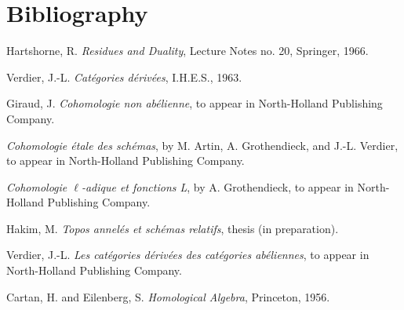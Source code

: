 \section*{Bibliography}
\begin{description}[leftmargin=2.5cm,style=nextline]
\item[{[H]}] Hartshorne, R. \emph{Residues and Duality}, Lecture Notes no. 20, Springer, 1966.
\item[{[V]}] Verdier, J.-L. \emph{Catégories dérivées}, I.H.E.S., 1963.
\item[{[G]}] Giraud, J. \emph{Cohomologie non abélienne}, to appear in North-Holland Publishing Company.
\item[{SGA 4}] \emph{Cohomologie étale des schémas}, by M. Artin, A. Grothendieck, and J.-L. Verdier, to appear in North-Holland Publishing Company.
\item[{SGA 5}] \emph{Cohomologie \(\ell\)-adique et fonctions L}, by A. Grothendieck, to appear in North-Holland Publishing Company.
\item[{[1]}] Hakim, M. \emph{Topos annelés et schémas relatifs}, thesis (in preparation).
\item[{[2]}] Verdier, J.-L. \emph{Les catégories dérivées des catégories abéliennes}, to appear in North-Holland Publishing Company.
\item[{[MUL]}] Cartan, H. and Eilenberg, S. \emph{Homological Algebra}, Princeton, 1956.
\end{description}



\providecommand{\cS}{\mathcal S}
\providecommand{\cCz}{\mathcal C_0}
\providecommand{\cCone}{\mathcal C_1}
\providecommand{\cA}{\mathcal A}
\providecommand{\cB}{\mathcal B}
\providecommand{\cL}{\mathcal L}
\providecommand{\cI}{\mathcal I}
\providecommand{\cJ}{\mathcal J}
\providecommand{\Db}{\mathrm D}
\providecommand{\Kb}{\mathrm K}
\providecommand{\Dminus}{\mathrm D^{-}}
\providecommand{\Kminus}{\mathrm K^{-}}
\providecommand{\Kbd}{\mathrm K^{b}}
\providecommand{\Mod}{\operatorname{Mod}}
\providecommand{\Lib}{\operatorname{Lib}}
\providecommand{\Loclib}{\operatorname{Loclib}}
\providecommand{\Qcoh}{\operatorname{Qcoh}}
\providecommand{\Coh}{\operatorname{Coh}}
\providecommand{\Ext}{\operatorname{Ext}}
\providecommand{\Hom}{\operatorname{Hom}}
\providecommand{\Ob}{\operatorname{ob}}
\providecommand{\im}{\operatorname{Im}}
\providecommand{\coker}{\operatorname{Coker}}
\providecommand{\coh}{\operatorname{coh}}
\providecommand{\parf}{\operatorname{parf}}
\providecommand{\amp}{\operatorname{amp}}
\providecommand{\RHom}{\operatorname{RHom}}



